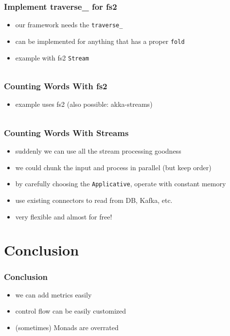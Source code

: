 \documentclass[aspectratio=169]{beamer}
\begin{document}
\begin{frame}[fragile]
  \frametitle{Implement traverse\_ for fs2}
  \begin{itemize}
  \item our framework needs the \texttt{traverse\_}
  \item can be implemented for anything that has a proper \texttt{fold}
  \item example with fs2 \texttt{Stream}
  \end{itemize}
  \vspace{5mm}
  \inputminted[fontsize=\small]{scala}{snippets/fs2-traverse-stream.scala}
\end{frame}

\begin{frame}[fragile]
  \frametitle{Counting Words With fs2}
  \begin{itemize}
  \item example uses fs2 (also possible: akka-streams)
  \end{itemize}
  \vspace{5mm}
  \inputminted[fontsize=\small]{scala}{snippets/fs2-count-words.scala}
\end{frame}

\begin{frame}
  \frametitle{Counting Words With Streams}
  \begin{itemize}
  \item suddenly we can use all the stream processing goodness
  \item we could chunk the input and process in parallel (but keep order)
  \item by carefully choosing the \texttt{Applicative}, operate with constant memory
  \item use existing connectors to read from DB, Kafka, etc.
  \item very flexible and almost for free!
  \end{itemize}
\end{frame}

\section{Conclusion}\label{sec:conclusion}

\begin{frame}
  \frametitle{Conclusion}
  \begin{itemize}
  \item we can add metrics easily
  \item control flow can be easily customized
  \item (sometimes) Monads are overrated
  \end{itemize}
\end{frame}
\end{document}
